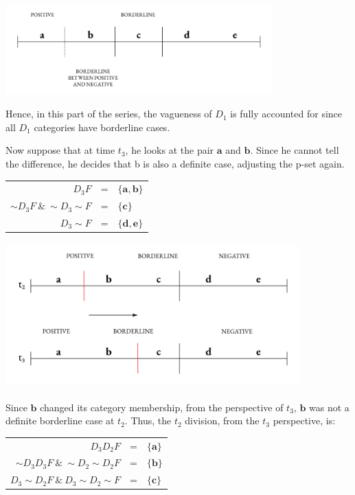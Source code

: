 \begin{center}
\includegraphics[width=0.77\textwidth]{papers/figures/2-4.pdf}
\end{center}
Hence, in this part of the series, the vagueness of \(D_{1}\) is fully
accounted for since all $D_{1}$ categories have borderline cases.

Now suppose that at time $t_{3}$, he looks at the pair $\mathbf{a}$ and
$\mathbf{b}$. Since he cannot tell the difference, he decides that b is
also a definite case, adjusting the p-set again.

\begin{center}
\begin{tabulary}{\textwidth}{RCL}
$D_3 F$ & = & $\{ \mathbf{a}, \mathbf{b} \}$ \\
${\sim} D_3F \ \& \ {\sim}D_{3}{\sim}F$ & = & $\{ \mathbf{c} \}$ \\
$D_{3}{\sim} F $ & = & $\{ \mathbf{d}, \mathbf{e} \}$
\end{tabulary}
\end{center}

\begin{center}
    \includegraphics[width=4.46286in,height=2.2071in]{papers/figures/2-5.pdf}
  \end{center}
Since $\mathbf{b}$ changed its category membership, from the perspective
of \(t_{3}\), $\mathbf{b}$ was not a definite borderline case at
\(t_{2}\). Thus, the \(t_{2}\) division, from the \(t_{3}\) perspective,
is:

\begin{center}
\begin{tabulary}{\textwidth}{RCL}
$D_3 D_2 F$ & = & $\{ \mathbf{a} \}$ \\
${\sim}D_3 D_3 F \ \& \ {\sim}D_2 {\sim}D_2 F$ & = & $\{ \mathbf{b} \}$ \\
$D_3 {\sim}D_2 F \ \& \ D_3 {\sim}D_2 {\sim}F$ & = & $\{ \mathbf{c} \}$
\end{tabulary}
\end{center}

